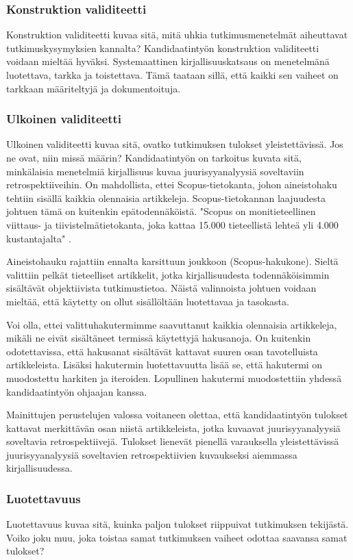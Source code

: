 \subsubsection{Konstruktion validiteetti}
Konstruktion validiteetti kuvaa sitä, mitä uhkia tutkimusmenetelmät aiheuttavat tutkimuskysymyksien kannalta? Kandidaatintyön konstruktion validiteetti voidaan mieltää hyväksi. Systemaattinen kirjallisuuskatsaus on menetelmänä luotettava, tarkka ja toistettava. Tämä taataan sillä, että kaikki sen vaiheet on tarkkaan määriteltyjä ja dokumentoituja.

\subsubsection{Ulkoinen validiteetti}
Ulkoinen validiteetti kuvaa sitä, ovatko tutkimuksen tulokset yleistettävissä. Jos ne ovat, niin missä määrin?
Kandidaatintyön on tarkoitus kuvata sitä, minkälaisia menetelmiä kirjallisuus kuvaa juurisyyanalyysiä soveltaviin retrospektiiveihin. On mahdollista, ettei Scopus-tietokanta, johon aineistohaku tehtiin sisällä kaikkia olennaisia artikkeleja. Scopus-tietokannan laajuudesta johtuen tämä on kuitenkin epätodennäköistä. "Scopus on monitieteellinen viittaus- ja tiivistelmätietokanta, joka kattaa 15.000 tieteellistä lehteä yli 4.000 kustantajalta" \citep{nelliScopusKuvaus}.

Aineistohauku rajattiin ennalta karsittuun joukkoon (Scopus-hakukone). Sieltä valittiin pelkät tieteelliset artikkelit, jotka kirjallisuudesta todennäköisimmin sisältävät objektiivista tutkimustietoa. Näistä valinnoista johtuen voidaan mieltää, että käytetty on ollut sisällöltään luotettavaa ja tasokasta.

Voi olla, ettei valittuhakutermimme saavuttanut kaikkia olennaisia artikkeleja, mikäli ne eivät sisältäneet termissä käytettyjä hakusanoja. On kuitenkin odotettavissa, että hakusanat sisältävät kattavat suuren osan tavotelluista artikkeleista. Lisäksi hakutermin luotettavuutta lisää se, että hakutermi on muodostettu harkiten ja iteroiden. Lopullinen hakutermi muodostettiin yhdessä kandidaatintyön ohjaajan kanssa. 

Mainittujen perustelujen valossa voitaneen olettaa, että kandidaatintyön tulokset kattavat merkittävän osan niistä artikkeleista, jotka kuvaavat juurisyyanalyysiä soveltavia retrospektiivejä. Tulokset lienevät pienellä varauksella yleistettävissä juurisyyanalyysiä soveltavien retrospektiivien kuvaukseksi aiemmassa kirjallisuudessa.

\subsubsection{Luotettavuus}
Luotettavuus kuvaa sitä, kuinka paljon tulokset riippuivat tutkimuksen tekijästä. Voiko joku muu, joka toistaa samat tutkimuksen vaiheet odottaa saavansa samat tulokset?

